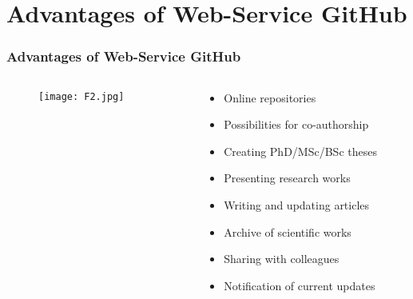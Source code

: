 \documentclass[pdflatex,compress,8pt,
	xcolor={dvipsnames,dvipsnames,svgnames,x11names,table},
	hyperref={
	breaklinks = true, 
	pdfauthor={Lemenkova Polina}, 
	pdfsubject={Preentation}, 
	pdfcreator={Lemenkova Polina}, 
	pdfproducer={Lemenkova Polina}, 
	colorlinks=true,linkcolor=blue, 
	citecolor=NavyBlue, 
	urlcolor = NavyBlue, 
	breaklinks = true}]{beamer}
\begin{document}
\section{Advantages of Web-Service GitHub}
\begin{frame}\frametitle{Advantages of Web-Service GitHub}
\begin{minipage}[0.4\textheight]{\textwidth}
\begin{columns}[T]
\begin{column}{0.5\textwidth}
\vspace{2em}
\begin{figure}[H]
	\centering
		\texttt{[image: F2.jpg]}
\end{figure}
\end{column}
\begin{column}{0.5\textwidth}
\vspace{4em}
\begin{itemize}
	\item Online repositories
	\item Possibilities for co-authorship
	\item Creating PhD/MSc/BSc theses
	\item Presenting research works
	\item Writing and updating articles
	\item Archive of scientific works
	\item Sharing with colleagues
	\item Notification of current updates
\end{itemize}
\end{column}
\end{columns}
\end{minipage}
\end{frame}
\end{document}

